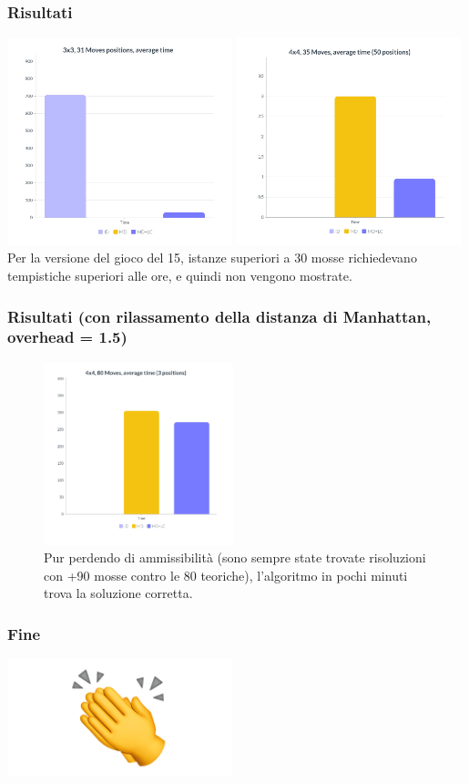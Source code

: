 \documentclass[11pt]{beamer}
\begin{document}
\begin{frame}
\frametitle{Risultati}
\includegraphics[width=0.49\textwidth]{3331.jpg}
\includegraphics[width=0.49\textwidth]{4435.jpg}
Per la versione del gioco del 15, istanze superiori a 30 mosse richiedevano tempistiche superiori alle ore, e quindi non vengono mostrate.
\centering
\end{frame}


\begin{frame}
\frametitle{Risultati (con rilassamento della distanza di Manhattan, overhead = 1.5)}
\begin{figure}
    \centering
    \includegraphics[width=0.49\textwidth]{relax.jpg}
    \caption{Pur perdendo di ammissibilità (sono sempre state trovate risoluzioni con +90 mosse contro le 80 teoriche), l'algoritmo in 
    pochi minuti trova la soluzione corretta.}
  \end{figure}

\centering
\end{frame}

\begin{frame}
\frametitle{Fine}
\includegraphics[width=0.49\textwidth]{clapping.png}
\centering
\end{frame}
\end{document}
